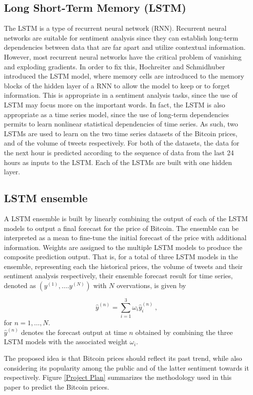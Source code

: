 \documentclass[conference]{IEEEtran}
\begin{document}
\subsection{Long Short-Term Memory (LSTM)}
\par The LSTM is a type of recurrent neural network (RNN). Recurrent neural networks are suitable for sentiment analysis since they can establish long-term dependencies between data that are far apart and utilize contextual information. However, most recurrent neural networks have the critical problem of vanishing and exploding gradients. In order to fix this, Hochreiter and Schmidhuber \cite{LSTM} introduced the LSTM model, where memory cells are introduced to the memory blocks of the hidden layer of a RNN to allow the model to keep or to forget information. This is appropriate in a sentiment analysis tasks, since the use of LSTM may focus more on the important words. In fact, the LSTM is also appropriate as a time series model, since the use of long-term dependencies permits to learn nonlinear statistical dependencies of time series. As such, two LSTMs are used to learn on the two time series datasets of the Bitcoin prices, and of the volume of tweets respectively. For both of the datasets, the data for the next hour is predicted according to the sequence of data from the last 24 hours as inputs to the LSTM. Each of the LSTMs are built with one hidden layer.

\subsection{LSTM ensemble}
\par A LSTM ensemble is built by linearly combining the output of each of the LSTM models to output a final forecast for the price of Bitcoin. The ensemble can be interpreted as a mean to fine-tune the initial forecast of the price with additional information. Weights are assigned to the multiple LSTM models to produce the composite prediction output. That is, for a total of three LSTM models in the ensemble, representing each the historical prices, the volume of tweets and their sentiment analysis respectively, their ensemble forecast result for time series, denoted as $(y^{(1)}, \dots. y^{(N)})$ with $N$ overvations, is given by 

\begin{equation}
\label{LSTM ensemble weights}
\hat{y}^{(n)} = \sum_{i = 1}^{3} \omega_{i} \hat{y}_{i}^{(n)} ~, 
\end{equation} 
for $n = 1, \dots, N$.\\
$\hat{y}^{(n)}$ denotes the forecast output at time $n$ obtained by combining the three LSTM models with the associated weight $\omega_{i}$.
\par The proposed idea is that Bitcoin prices should reflect its past trend, while also considering its popularity among the public and of the latter sentiment towards it respectively. Figure \ref{Project Plan} summarizes the methodology used in this paper to predict the Bitcoin prices.
\end{document}
